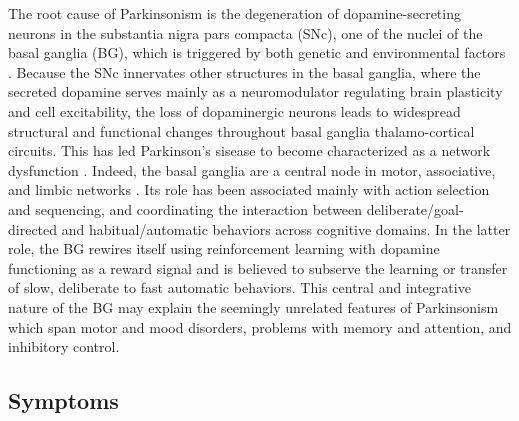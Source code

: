 %
The root cause of Parkinsonism is the degeneration of dopamine-secreting neurons
in the substantia nigra pars compacta (SNc), one of the nuclei of the basal
ganglia (BG), which is triggered by both genetic and environmental factors
\cite{kalia_parkinsons_2015}. Because the SNc innervates other structures in the
basal ganglia, where the secreted dopamine serves mainly as a neuromodulator
regulating brain plasticity and cell excitability, the loss of dopaminergic
neurons leads to widespread structural and functional changes throughout basal
ganglia thalamo-cortical circuits. This has led Parkinson's sisease to become
characterized as a network dysfunction \cite{mcintyre_network_2010}. Indeed,
the basal ganglia are a central node in motor, associative, and limbic networks
\cite{jahanshahi_frontostriatosubthalamicpallidal_2015}. Its role has been
associated mainly with action selection and sequencing, and coordinating the
interaction between deliberate/goal-directed and habitual/automatic behaviors across
cognitive domains. In the latter role, the BG rewires itself using reinforcement
learning with dopamine functioning as a reward signal and is believed to subserve
the learning or transfer of slow, deliberate to fast automatic behaviors.
%
This central and integrative nature of the BG may explain the seemingly unrelated
features of Parkinsonism which span motor and mood disorders, problems with memory
and attention, and inhibitory control.

\subsection{Symptoms}
%
%
%
%
%
%
%
%
%


